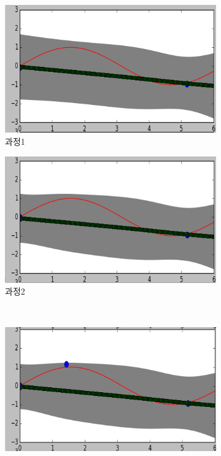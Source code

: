 \documentclass[a4paper]{oblivoir}
\begin{document}
\begin{figure}[ht]
   \begin{subfigure}[b]{0.5\textwidth}
     \includegraphics[width=\textwidth]{fig12_21.png}
     \caption{과정1}
   \end{subfigure}\hspace{0.1cm}
   \begin{subfigure}[b]{0.5\textwidth}
     \includegraphics[width=\textwidth]{fig12_22.png}
     \caption{과정2}
   \end{subfigure}\\
   \begin{subfigure}[b]{0.5\textwidth}
     \includegraphics[width=\textwidth]{fig12_23.png}

\end{subfigure}
\end{figure}
\end{document}
